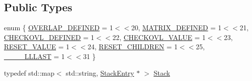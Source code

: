 \subsection*{Public Types}
\begin{DoxyCompactItemize}
\item 
enum \{ \newline
\hyperlink{class_d_d4hep_1_1_alignments_1_1_alignment_stack_a52684bf45771fe0444855e41ae789569a4033cb4255581775569f2e2f722aaa81}{O\+V\+E\+R\+L\+A\+P\+\_\+\+D\+E\+F\+I\+N\+ED} = 1$<$$<$20, 
\hyperlink{class_d_d4hep_1_1_alignments_1_1_alignment_stack_a52684bf45771fe0444855e41ae789569a01f610d083823850012566acef4ec42b}{M\+A\+T\+R\+I\+X\+\_\+\+D\+E\+F\+I\+N\+ED} = 1$<$$<$21, 
\hyperlink{class_d_d4hep_1_1_alignments_1_1_alignment_stack_a52684bf45771fe0444855e41ae789569aee39f024ccc317ee886361ffbe1f011b}{C\+H\+E\+C\+K\+O\+V\+L\+\_\+\+D\+E\+F\+I\+N\+ED} = 1$<$$<$22, 
\hyperlink{class_d_d4hep_1_1_alignments_1_1_alignment_stack_a52684bf45771fe0444855e41ae789569a96646fe7ea980fd76a69495c22c271a4}{C\+H\+E\+C\+K\+O\+V\+L\+\_\+\+V\+A\+L\+UE} = 1$<$$<$23, 
\newline
\hyperlink{class_d_d4hep_1_1_alignments_1_1_alignment_stack_a52684bf45771fe0444855e41ae789569ada369239b042e83f1b72c5a8885299ee}{R\+E\+S\+E\+T\+\_\+\+V\+A\+L\+UE} = 1$<$$<$24, 
\hyperlink{class_d_d4hep_1_1_alignments_1_1_alignment_stack_a52684bf45771fe0444855e41ae789569aacd486a45b60924aec0660fa27eedb7f}{R\+E\+S\+E\+T\+\_\+\+C\+H\+I\+L\+D\+R\+EN} = 1$<$$<$25, 
\hyperlink{class_d_d4hep_1_1_alignments_1_1_alignment_stack_a52684bf45771fe0444855e41ae789569a22cc90a28cfb915750adda75ed6bfc1d}{\+\_\+\+\_\+\+\_\+\+\_\+\+L\+L\+L\+A\+ST} = 1$<$$<$31
 \}
\item 
typedef std\+::map$<$ std\+::string, \hyperlink{struct_d_d4hep_1_1_alignments_1_1_alignment_stack_1_1_stack_entry}{Stack\+Entry} $\ast$ $>$ \hyperlink{class_d_d4hep_1_1_alignments_1_1_alignment_stack_a14076338e30231119d5d291b5ac316ee}{Stack}
\end{DoxyCompactItemize}
